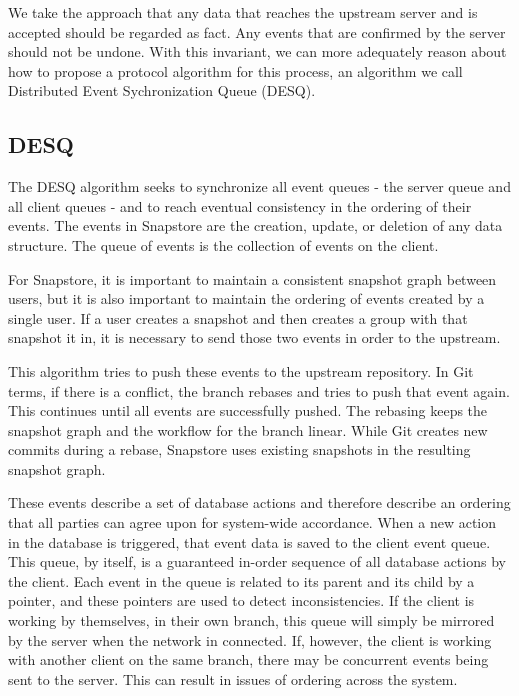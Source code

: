 We take the approach that any data that reaches the upstream server and is accepted should be regarded as fact. Any events that are confirmed by the server should not be undone. With this invariant, we can more adequately reason about how to propose a protocol algorithm for this process, an algorithm we call Distributed Event Sychronization Queue (DESQ).

\subsection{DESQ} 

The DESQ algorithm seeks to synchronize all event queues - the server queue and all client queues - and to reach eventual consistency in the ordering of their events. The events in Snapstore are the creation, update, or deletion of any data structure. The queue of events is the collection of events on the client.

For Snapstore, it is important to maintain a consistent snapshot graph between users, but it is also important to maintain the ordering of events created by a single user. If a user creates a snapshot and then creates a group with that snapshot it in, it is necessary to send those two events in order to the upstream. 

This algorithm tries to push these events to the upstream repository. In Git terms, if there is a conflict, the branch rebases and tries to push that event again. This continues until all events are successfully pushed. The rebasing keeps the snapshot graph and the workflow for the branch linear. While Git creates new commits during a rebase, Snapstore uses existing snapshots in the resulting snapshot graph.

These events describe a set of database actions and therefore describe an ordering that all parties can agree upon for system-wide accordance. When a new action in the database is triggered, that event data is saved to the client event queue. This queue, by itself, is a guaranteed in-order sequence of all database actions by the client. Each event in the queue is related to its parent and its child by a pointer, and these pointers are used to detect inconsistencies. If the client is working by themselves, in their own branch, this queue will simply be mirrored by the server when the network in connected. If, however, the client is working with another client on the same branch, there may be concurrent events being sent to the server. This can result in issues of ordering across the system.

